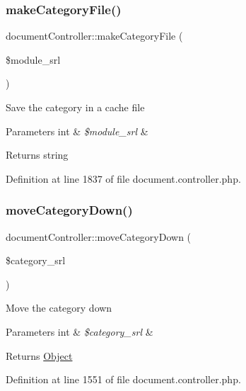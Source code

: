 \subsubsection{\texorpdfstring{make\+Category\+File()}{makeCategoryFile()}}
{\footnotesize\ttfamily document\+Controller\+::make\+Category\+File (\begin{DoxyParamCaption}\item[{}]{\$module\+\_\+srl }\end{DoxyParamCaption})}

Save the category in a cache file 
\begin{DoxyParams}[1]{Parameters}
int & {\em \$module\+\_\+srl} & \\
\hline
\end{DoxyParams}
\begin{DoxyReturn}{Returns}
string 
\end{DoxyReturn}


Definition at line 1837 of file document.\+controller.\+php.

\hypertarget{classdocumentController_ab6befd47268a1fbfcc56dda3c3a71dc4}{}\label{classdocumentController_ab6befd47268a1fbfcc56dda3c3a71dc4} 
\subsubsection{\texorpdfstring{move\+Category\+Down()}{moveCategoryDown()}}
{\footnotesize\ttfamily document\+Controller\+::move\+Category\+Down (\begin{DoxyParamCaption}\item[{}]{\$category\+\_\+srl }\end{DoxyParamCaption})}

Move the category down 
\begin{DoxyParams}[1]{Parameters}
int & {\em \$category\+\_\+srl} & \\
\hline
\end{DoxyParams}
\begin{DoxyReturn}{Returns}
\hyperlink{classObject}{Object} 
\end{DoxyReturn}


Definition at line 1551 of file document.\+controller.\+php.

\hypertarget{classdocumentController_a16a00fabad8b270e40d7fa196350280c}{}\label{classdocumentController_a16a00fabad8b270e40d7fa196350280c} 
